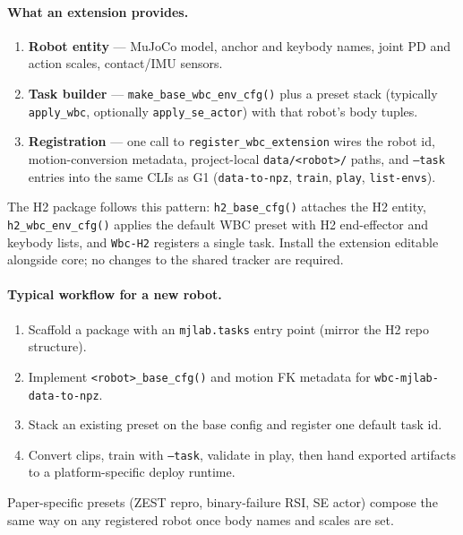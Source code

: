 \documentclass[11pt,a4paper]{article}
\begin{document}
\paragraph{What an extension provides.}
\begin{enumerate}[leftmargin=1.4em,itemsep=0.12em]
  \item \textbf{Robot entity} --- MuJoCo model, anchor and keybody names, joint
        PD and action scales, contact/IMU sensors.
  \item \textbf{Task builder} --- \texttt{make\_base\_wbc\_env\_cfg()} plus a
        preset stack (typically \texttt{apply\_wbc}, optionally
        \texttt{apply\_se\_actor}) with that robot's body tuples.
  \item \textbf{Registration} --- one call to \texttt{register\_wbc\_extension}
        wires the robot id, motion-conversion metadata, project-local
        \texttt{data/<robot>/} paths, and \texttt{--task} entries into the
        same CLIs as G1 (\texttt{data-to-npz}, \texttt{train}, \texttt{play},
        \texttt{list-envs}).
\end{enumerate}
The H2 package follows this pattern: \texttt{h2\_base\_cfg()} attaches the H2
entity, \texttt{h2\_wbc\_env\_cfg()} applies the default WBC preset with H2
end-effector and keybody lists, and \texttt{Wbc-H2} registers a single task.
Install the extension editable alongside core; no changes to the shared tracker
are required.

\paragraph{Typical workflow for a new robot.}
\begin{enumerate}[leftmargin=1.4em,itemsep=0.12em]
  \item Scaffold a package with an \texttt{mjlab.tasks} entry point (mirror the
        H2 repo structure).
  \item Implement \texttt{<robot>\_base\_cfg()} and motion FK metadata for
        \texttt{wbc-mjlab-data-to-npz}.
  \item Stack an existing preset on the base config and register one default
        task id.
  \item Convert clips, train with \texttt{--task}, validate in play, then hand
        exported artifacts to a platform-specific deploy runtime.
\end{enumerate}
Paper-specific presets (ZEST repro, binary-failure RSI, SE actor) compose the
same way on any registered robot once body names and scales are set.
\end{document}
